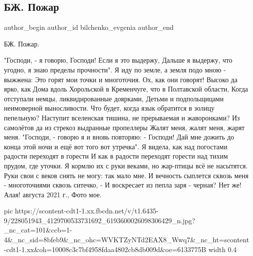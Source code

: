  
 
 
 
 
 
\subsection{БЖ. Пожар}
\label{sec:07_08_2021.fb.bilchenko_evgenia.1.pozhar}
 
\ifcmt
 author_begin
   author_id bilchenko_evgenia
 author_end
\fi

БЖ. Пожар.

\begin{multicols}{2}
\obeycr
"Господи, - я говорю, Господи! Если я это выдержу,
Дальше я выдержу, что угодно, я знаю пределы прочности".
Я иду по земле, а земля подо мною - выжжена:
Это горят мои точки и многоточия.
\smallskip
Ох, как они говорят! Высоко да ярко, как
Дома вдоль Хорольской в Кременчуге, что в Полтавской области,
Когда отступали немцы, ликвидированные доярками,
Детьми и подпольщицами  неимоверной выносливости.
\smallskip
Что будет, когда язык обратится в золицу пепельную?
Наступит вселенская тишина, не прерываемая и жаворонками?
Из самолётов да из стрекоз выдранные пропеллеры
Жалят меня, жалят меня, жарят меня.
\smallskip
"Господи, - говорю я и вновь повторяю: - Господи!
Дай мне дожить до конца этой ночи и ещё вот того вот утречка".
Я видела, как над погостами радости переходят в горести
И как в радости переходят горести над тихим прудом, где уточки.
\smallskip
Я кормлю их с руки веками, но жар-птицы всё не насытятся.
Руки свои с веков снять не могу: так мало мне.
И вечность сыплется сквозь меня - многоточиями сквозь ситечко, -
И воскресает из пепла заря - черная? Нет же! Алая!
 августа 2021 г.,  Фото мое.
\restorecr
\end{multicols}

\ifcmt
  pic https://scontent-cdt1-1.xx.fbcdn.net/v/t1.6435-9/228051943_4129700533731692_6193600026098306429_n.jpg?_nc_cat=101&ccb=1-4&_nc_sid=8bfeb9&_nc_ohc=WVKTZyNTd2EAX8_Wwq7&_nc_ht=scontent-cdt1-1.xx&oh=10008c3c7bf4958fdaa4802cb8db009d&oe=6133775B
  width 0.4
\fi

